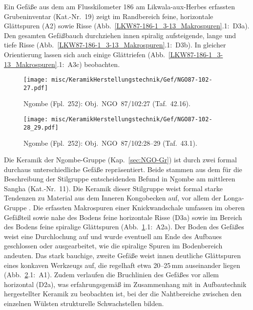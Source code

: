 Ein Gefäße aus dem am Flusskilometer 186 am Likwala-aux-Herbes erfassten Grubeninventar (Kat.-Nr.~19) zeigt im Randbereich  feine, horizontale Glättspuren (A2) sowie Risse (Abb.~\ref{LKW87-186-1_3-13_Makrospuren}.1:~D3a). Den gesamten Gefäßbauch durchziehen innen spiralig aufsteigende, lange und tiefe Risse (Abb.~\ref{LKW87-186-1_3-13_Makrospuren}.1:~D3b). In gleicher Orientierung lassen sich auch einige Glättriefen (Abb.~\ref{LKW87-186-1_3-13_Makrospuren}.1:~A3c) beobachten. 

\begin{figure*}[p]
	\centering
	\begin{subfigure}{\textwidth}
		\centering
		\texttt{[image: misc/KeramikHerstellungstechnik/Gef/NGO87-102-27.pdf]}
		\caption{Ngombe (Fpl.~252): Obj.~NGO~87/102:27 (Taf.~42.16).\vspace{1em}}
		\label{NGO87-102-27_Makrospuren}
	\end{subfigure}
	\begin{subfigure}{\textwidth}
		\centering
		\texttt{[image: misc/KeramikHerstellungstechnik/Gef/NGO87-102-28\_29.pdf]}
		\caption{Ngombe (Fpl.~252): Obj.~NGO~87/102:28--29 (Taf.~43.1).}
		\label{NGO87-102-28_29_Makrospuren}
	\end{subfigure}
	\caption{Makrospuren: Aufnahme und Details.}
\end{figure*}

Die Keramik der Ngombe-Gruppe (Kap.~\ref{sec:NGO-Gr}) ist durch zwei formal durchaus unterschiedliche Gefäße repräsentiert. Beide stammen aus dem für die Beschreibung der Stilgruppe entscheidenden Befund in Ngombe am mittleren Sangha (Kat.-Nr.~11). Die Keramik dieser Stilgruppe weist formal starke Tendenzen zu Material aus dem Inneren Kongobecken auf, vor allem der Longa-Gruppe \parencite[121--128]{Wotzka.1995}. Die erfassten Makrospuren einer Knickwandschale umfassen im oberen Gefäßteil sowie nahe des Bodens feine horizontale Risse (D3a) sowie im Bereich des Bodens feine spiralige Glättspuren (Abb.~\ref{NGO87-102-27_Makrospuren}.1:~A2a). Der Boden des Gefäßes weist eine Durchlochung auf und wurde eventuell am Ende des Aufbaues geschlossen oder ausgearbeitet, wie die spiralige Spuren im Bodenbereich andeuten. Das stark bauchige, zweite Gefäße weist innen deutliche Glättspuren eines konkaven Werkzeugs auf, die regelhaft etwa 20--25\,mm auseinander liegen (Abb.~\ref{NGO87-102-28_29_Makrospuren}.1:~A1). Zudem verlaufen die Bruchlinien des Gefäßes vor allem horizontal (D2a), was erfahrungsgemäß im Zusammenhang mit in Aufbautechnik hergestellter Keramik zu beobachten ist, bei der die Nahtbereiche zwischen den einzelnen Wülsten strukturelle Schwachstellen bilden.

